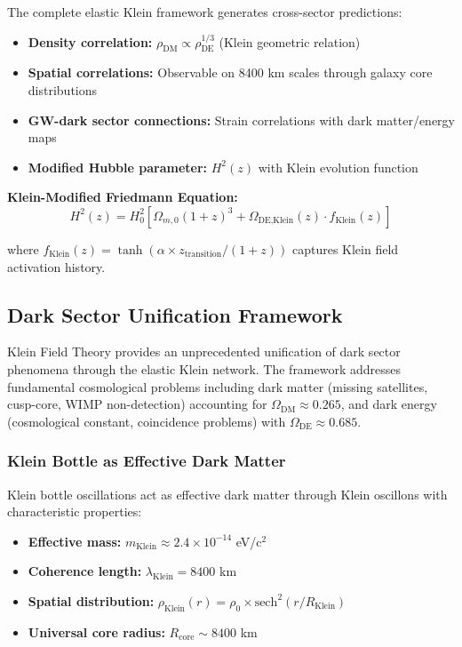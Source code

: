 \documentclass[12pt]{iopart}
\begin{document}
The complete elastic Klein framework generates cross-sector predictions:
\begin{itemize}
\item \textbf{Density correlation:} $\rho_{\text{DM}} \propto \rho_{\text{DE}}^{1/3}$ (Klein geometric relation)
\item \textbf{Spatial correlations:} Observable on 8400 km scales through galaxy core distributions
\item \textbf{GW-dark sector connections:} Strain correlations with dark matter/energy maps
\item \textbf{Modified Hubble parameter:} $H^2(z)$ with Klein evolution function
\end{itemize}

\textbf{Klein-Modified Friedmann Equation:}
\begin{equation}
H^2(z) = H_0^2[\Omega_{m,0}(1+z)^3 + \Omega_{\text{DE,Klein}}(z) \cdot f_{\text{Klein}}(z)]
\end{equation}

where $f_{\text{Klein}}(z) = \tanh(\alpha \times z_{\text{transition}}/(1+z))$ captures Klein field activation history.

\subsection{Dark Sector Unification Framework}

Klein Field Theory provides an unprecedented unification of dark sector phenomena through the elastic Klein network. The framework addresses fundamental cosmological problems including dark matter (missing satellites, cusp-core, WIMP non-detection) accounting for $\Omega_{\text{DM}} \approx 0.265$, and dark energy (cosmological constant, coincidence problems) with $\Omega_{\text{DE}} \approx 0.685$.

\subsubsection{Klein Bottle as Effective Dark Matter}

Klein bottle oscillations act as effective dark matter through Klein oscillons with characteristic properties:
\begin{itemize}
\item \textbf{Effective mass:} $m_{\text{Klein}} \approx 2.4 \times 10^{-14}$ eV/c$^2$
\item \textbf{Coherence length:} $\lambda_{\text{Klein}} = 8400$ km  
\item \textbf{Spatial distribution:} $\rho_{\text{Klein}}(r) = \rho_0 \times \text{sech}^2(r/R_{\text{Klein}})$
\item \textbf{Universal core radius:} $R_{\text{core}} \sim 8400$ km
\end{itemize}
\end{document}
